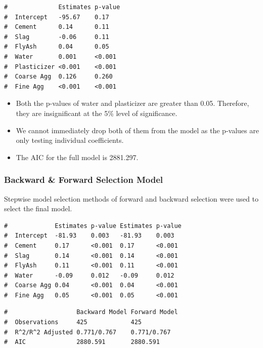 \documentclass[letterpaper,9pt,twocolumn,twoside,]{pinp}
\providecommand{\tightlist}{%
  \setlength{\itemsep}{0pt}\setlength{\parskip}{0pt}}
\begin{document}
\begin{ShadedResult}
\begin{verbatim}
#              Estimates p-value
#  Intercept   -95.67    0.17   
#  Cement      0.14      0.11   
#  Slag        -0.06     0.11   
#  FlyAsh      0.04      0.05   
#  Water       0.001     <0.001 
#  Plasticizer <0.001    <0.001 
#  Coarse Agg  0.126     0.260  
#  Fine Agg    <0.001    <0.001
\end{verbatim}
\end{ShadedResult}

\begin{itemize}
\tightlist
\item
  Both the p-values of water and plasticizer are greater than 0.05.
  Therefore, they are insignificant at the 5\% level of significance.
\item
  We cannot immediately drop both of them from the model as the p-values
  are only testing individual coefficients.
\item
  The AIC for the full model is 2881.297.
\end{itemize}

\hypertarget{backward-forward-selection-model}{%
\subsubsection{Backward \& Forward Selection
Model}\label{backward-forward-selection-model}}

Stepwise model selection methods of forward and backward selection were
used to select the final model.

\begin{ShadedResult}
\begin{verbatim}
#             Estimates p-value Estimates p-value
#  Intercept  -81.93    0.003   -81.93    0.003  
#  Cement     0.17      <0.001  0.17      <0.001 
#  Slag       0.14      <0.001  0.14      <0.001 
#  FlyAsh     0.11      <0.001  0.11      <0.001 
#  Water      -0.09     0.012   -0.09     0.012  
#  Coarse Agg 0.04      <0.001  0.04      <0.001 
#  Fine Agg   0.05      <0.001  0.05      <0.001
\end{verbatim}
\end{ShadedResult}

\begin{ShadedResult}
\begin{verbatim}
#                   Backward Model Forward Model
#  Observations     425            425          
#  R^2/R^2 Adjusted 0.771/0.767    0.771/0.767  
#  AIC              2880.591       2880.591
\end{verbatim}
\end{ShadedResult}
\end{document}
